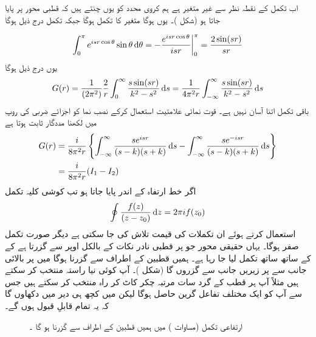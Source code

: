 اب  تکمل کے نقطہ  نظر سے  غیر متغیر ہے ہم کروی محدد  کو یوں چنتے ہیں کہ  قطبی محور پر پایا جاتا ہو  (شکل )۔ یوں  ہوگا متغیر  کا تکمل  ہوگا جبکہ  تکمل درج ذیل ہوگا
 
\begin{align}
	\int_{0}^{\pi}e^{isr\cos\theta}\sin\theta\dif\theta = -\frac{e^{isr\cos\theta}}{isr}\bigg|^\pi_{0} = \frac{2\sin(sr)}{sr}
\end{align}
یوں درج ذیل ہوگا
\begin{align}
	G(r) = \frac{1}{(2\pi^2)}\frac{2}{r}\int_{0}^{\infty}\frac{s \sin(sr)}{k^2-s^2}\dif s = \frac{1}{4\pi^2r}\int_{-\infty}^{\infty}\frac{s \sin(sr)}{k^2-s^2}\dif s
\end{align}
باقی تکمل اتنا آسان نہیں ہے۔ قوت نمائی علامتیت استعمال کرکے نصب نما کو اجزائے ضربی کی روپ میں لکھنا مددگار ثابت ہوتا ہے
\begin{align}\label{مساوات_بکھراو_گرین_دوبارہ}
	G(r) &= \frac{i}{8\pi^2r}\left\{\int_{-\infty}^{\infty}\frac{se^{isr}}{(s-k)(s+k)}\dif s-\int_{-\infty}^{\infty}\frac{se^{-isr}}{(s-k)(s+k)}\dif s\right\}\nonumber \\
	&= \frac{i}{8\pi^2r}(I_1-I_2)
\end{align}
اگر  خط ارتفاہ کے اندر پایا جاتا ہو تب کوشی کلیہ تکمل 
\begin{align}
	\oint\frac{f(z)}{(z-z_0)}\dif z = 2\pi if(z_0)
\end{align}
استعمال کرتے ہوئے ان تکملات کی قیمت تلاش کی جا سکتی ہے دیگر صورت تکمل صفر ہوگا۔ یہاں حقیقی محور جو  پر قطبی نادر نکات کے بالکل  اوپر سے گزرتا ہے کے کے ساتھ ساتھ تکمل لیا جا رہا ہے۔ ہمیں قطبین کے اطراف سے گزرنا ہوگا میں  پر بالائی جانب سے  پر زیریں جانب سے گزروں گا (شکل )۔ آپ کوئی نیا راستہ منتخب کر سکتے ہیں مثلاً آپ ہر قطب کے گرد سات مرتبہ چکر کاٹ کر راہ منتخب کر سکتے ہیں جس سے آپ کو ایک مختلف تفاعل گرین حاصل ہوگا لیکن میں کچھ ہی دیر میں دکھاوں گا کہ یہ تمام قابلِ قبول ہوں گے۔
\begin{figure}
\centering
{}
\caption{ارتفاعی تکمل (مساوات ) میں ہمیں  قطبین کے  اطراف سے گزرنا ہو گا ۔}
\label{شکل_بکھراو_قطبین_اطراف_گزرنا}
\end{figure}
